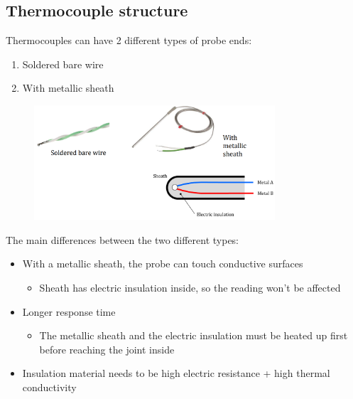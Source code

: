 \documentclass[class=report, crop=false, 12pt,a4paper]{standalone}
\begin{document}
\subsection{Thermocouple structure}
Thermocouples can have 2 different types of probe ends:
\begin{enumerate}
  \item Soldered bare wire
  \item With metallic sheath
\end{enumerate}
\begin{figure}[H]
  \centering
  \includegraphics[width = 0.8\textwidth]{../img/Mdiagram66.png}
\end{figure}
The main differences between the two different types:
\begin{itemize}
  \item With a metallic sheath, the probe can touch conductive surfaces
  \begin{itemize}
    \item Sheath has electric insulation inside, so the reading won't be affected
  \end{itemize}
  \item Longer response time
  \begin{itemize}
    \item The metallic sheath and the electric insulation must be heated up first before reaching the joint inside
  \end{itemize}
  \item Insulation material needs to be high electric resistance + high thermal conductivity
\end{itemize}
\end{document}
